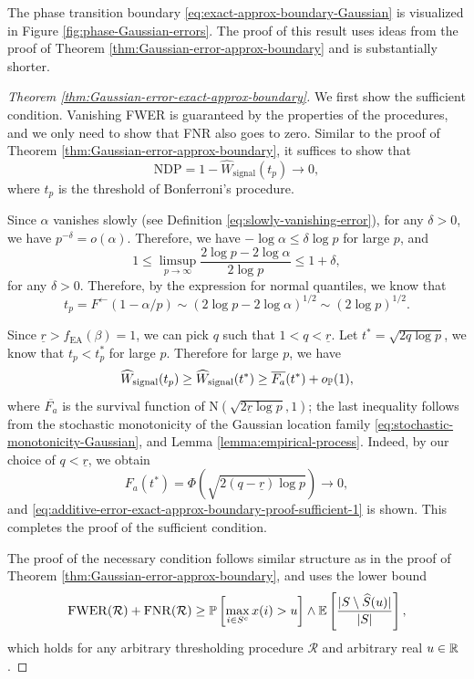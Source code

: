 The phase transition boundary \eqref{eq:exact-approx-boundary-Gaussian} is visualized in Figure \ref{fig:phase-Gaussian-errors}. The proof of this result
uses ideas from the proof of Theorem \ref{thm:Gaussian-error-approx-boundary} and is substantially shorter.

\begin{proof}[Theorem \ref{thm:Gaussian-error-exact-approx-boundary}]
We first show the sufficient condition. 
Vanishing FWER is guaranteed by the properties of the procedures, and we only need to show that FNR also goes to zero. 
Similar to the proof of Theorem \ref{thm:Gaussian-error-approx-boundary}, it suffices to show that
\begin{equation} \label{eq:additive-error-exact-approx-boundary-proof-sufficient-1}
    \text{NDP} = 1 - \widehat{W}_\text{signal}(t_p) \to 0,
\end{equation}
where $t_p$ is the threshold of Bonferroni's procedure.

Since $\alpha$ vanishes slowly (see Definition \ref{eq:slowly-vanishing-error}), for any $\delta>0$, we have $p^{-\delta}=o(\alpha)$.
Therefore, we have $-\log\alpha\le\delta\log{p}$ for large $p$, and
\begin{equation*} 
    1 \le \limsup_{p\to\infty}\frac{2\log{p} - 2\log{\alpha}}{2\log{p}} \le 1+\delta,
\end{equation*}
for any $\delta>0$.
Therefore, by the expression for normal quantiles, we know that 
$$
t_p=F^\leftarrow(1-\alpha/p)\sim(2\log{p}-2\log{\alpha})^{1/2} \sim(2\log{p})^{1/2}.
$$

Since $\underline{r}>f_{\mathrm{EA}}(\beta)=1$, we can pick $q$ such that $1<q<\underline{r}$.
Let $t^* = \sqrt{2q\log{p}}$, we know that $t_p<t_p^*$ for large $p$.
Therefore for large $p$, we have
$$
\widehat{W}_\text{signal}(t_p) \ge \widehat{W}_\text{signal}(t^*) \ge \overline{F_a}(t^*) + o_\P(1),
$$
where $\overline{F_a}$ is the survival function of $\mathrm{N}(\sqrt{2\underline{r}\log{p}}, 1)$; the last inequality follows from the stochastic monotonicity of the Gaussian location family \eqref{eq:stochastic-monotonicity-Gaussian}, and Lemma \ref{lemma:empirical-process}.
Indeed, by our choice of $q<\underline{r}$, we obtain
$$
F_a(t^*) = \Phi\left(\sqrt{2(q-\underline{r})\log{p}}\right)\to0,
$$
and \eqref{eq:additive-error-exact-approx-boundary-proof-sufficient-1} is shown. 
This completes the proof of the sufficient condition.

The proof of the necessary condition follows similar structure as in the proof of Theorem \ref{thm:Gaussian-error-approx-boundary}, and uses the lower bound
\begin{equation} \label{eq:additive-error-exact-approx-boundary-proof-necessary-1}
    \mathrm{FWER}(\mathcal{R}) + \mathrm{FNR}(\mathcal{R}) \ge \P\left[\max_{i\in S^c}x(i)>u\right] \wedge \E\left[\frac{|S\setminus \widehat{S}(u)|}{|S|}\right],
\end{equation}
which holds for any arbitrary thresholding procedure $\mathcal{R}$ and arbitrary real $u\in\R$.


\end{proof}
